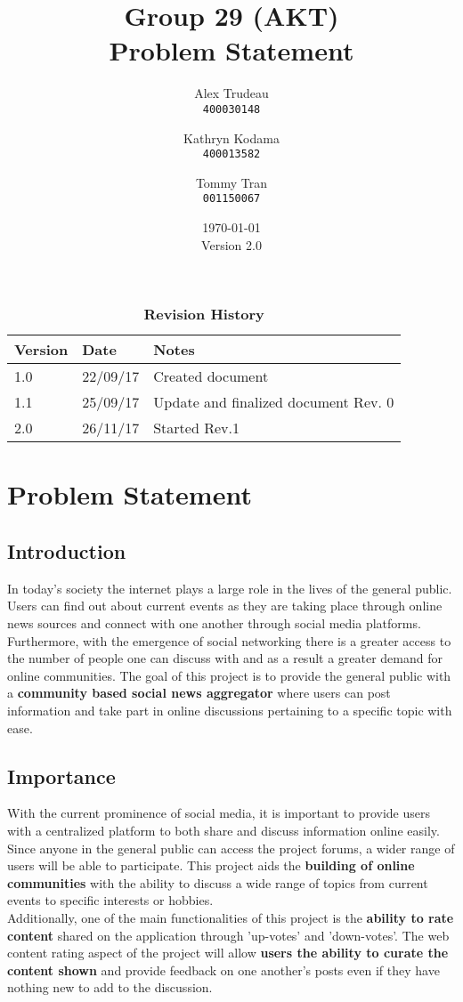\documentclass[12pt,fleqn]{article}
\title{Group 29 (AKT)\\ Problem Statement}
\author{
Alex Trudeau\\
	\texttt{400030148}
\and
Kathryn Kodama\\
  	\texttt{400013582}
\and
Tommy Tran\\
	\texttt{001150067}
}
\date{\today\\Version 2.0}
\begin{document}
\maketitle
\begin{table}[ht]
\caption{\bf Revision History}
\begin{tabularx}{\textwidth}{p{3cm}p{2cm}X}
\toprule {\bf Version} & {\bf Date} & {\bf Notes}\\
\midrule
1.0 & 22/09/17 & Created document \\
1.1 & 25/09/17 & Update and finalized document Rev. 0 \\
2.0 & 26/11/17 & Started Rev.1 \\
\bottomrule
\end{tabularx}
\end{table}

\pagebreak
\section*{}
\section {Problem Statement}

\subsection{Introduction}

In today's society the internet plays a large role in the lives of the general public. Users can find out about current events as they are taking place through online news sources and connect with one another through social media platforms.  Furthermore, with the emergence of social networking there is a greater access to the number of people one can discuss with and as a result a greater demand for online communities.  The goal of this project is to provide the general public with a \textbf{community based social news aggregator} where users can post information and take part in online discussions pertaining to a specific topic with ease.  

\subsection{Importance}

With the current prominence of social media, it is important to provide users with a centralized platform to both share and discuss information online easily.  Since anyone in the general public can access the project forums, a wider range of users will be able to participate.  This project aids the \textbf{building of online communities} with the ability to discuss a wide range of topics from current events to specific interests or hobbies. \\
\newline
Additionally, one of the main functionalities of this project is the \textbf{ability to rate content} shared on the application through 'up-votes' and 'down-votes'.  The web content rating aspect of the project will allow \textbf{users the ability to curate the content shown} and provide feedback on one another's posts even if they have nothing new to add to the discussion.  
\end{document}
